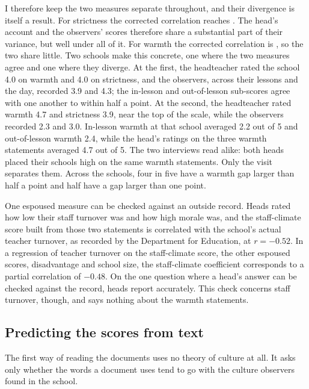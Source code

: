 I therefore keep
the two measures separate throughout, and their divergence is itself a result. For strictness the corrected correlation reaches \DisSplitS{}. The head's account and the observers' scores therefore share a substantial part of their variance, but well under all of it. For warmth the corrected correlation is \DisSplitW{}, so the two share little. Two schools make this concrete, one where the two measures agree and one where they diverge. At the first, the headteacher rated the school 4.0 on warmth and 4.0 on strictness, and the observers, across their lessons and the day, recorded 3.9 and 4.3; the in-lesson and out-of-lesson sub-scores agree with one another to within half a point. At the second, the headteacher rated warmth 4.7 and strictness 3.9, near the top of the scale, while the observers recorded 2.3 and 3.0. In-lesson warmth at that school
averaged 2.2 out of 5 and out-of-lesson warmth 2.4, while the head's ratings
on the three warmth statements averaged 4.7 out of 5. The two interviews read alike: both heads placed their schools high on the same warmth statements. Only the visit separates them. Across the \NTierOne{} schools, four in five have a warmth gap larger than half a point and half have a gap larger than one point.

One espoused measure can be checked against an outside record. Heads rated how low their staff turnover was and how high
morale was, and the staff-climate score built from those two statements is
correlated with the school's actual teacher turnover, as recorded by the
Department for Education, at $r = -0.52$. In a regression of teacher turnover on the staff-climate score, the other espoused scores, disadvantage and school size, the staff-climate coefficient corresponds to a partial correlation of $-0.48$. On the one
question where a head's answer can be checked against the record, heads
report accurately. This check concerns staff turnover, though, and says nothing about
the warmth statements.

\subsection{Predicting the scores from text}
\label{sec:p1_prediction}

The first way of reading the documents uses no theory of culture at all. It asks only whether
the words a document uses tend to go with the culture observers found in the school.

